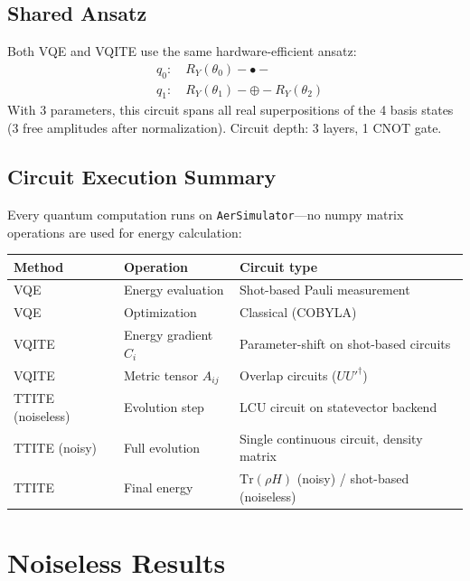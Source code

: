 \documentclass[11pt,a4paper]{article}
\begin{document}
\subsection{Shared Ansatz}

Both VQE and VQITE use the same hardware-efficient ansatz:
\begin{equation}
  \begin{aligned}
  &q_0: \quad R_Y(\theta_0) - \bullet - \\
  &q_1: \quad R_Y(\theta_1) - \oplus - R_Y(\theta_2)
  \end{aligned}
\end{equation}
With 3 parameters, this circuit spans all real superpositions of the 4 basis
states (3 free amplitudes after normalization). Circuit depth: 3 layers,
1 CNOT gate.

\subsection{Circuit Execution Summary}

Every quantum computation runs on \texttt{AerSimulator}---no numpy matrix
operations are used for energy calculation:

\begin{center}
\small
\begin{tabular}{@{}l l l@{}}
\toprule
Method & Operation & Circuit type \\
\midrule
VQE & Energy evaluation & Shot-based Pauli measurement \\
VQE & Optimization & Classical (COBYLA) \\
\midrule
VQITE & Energy gradient $C_i$ & Parameter-shift on shot-based circuits \\
VQITE & Metric tensor $A_{ij}$ & Overlap circuits ($U U'^\dagger$) \\
\midrule
TTITE (noiseless) & Evolution step & LCU circuit on statevector backend \\
TTITE (noisy) & Full evolution & Single continuous circuit, density matrix \\
TTITE & Final energy & $\text{Tr}(\rho H)$ (noisy) / shot-based (noiseless) \\
\bottomrule
\end{tabular}
\end{center}


\section{Noiseless Results}
\end{document}
